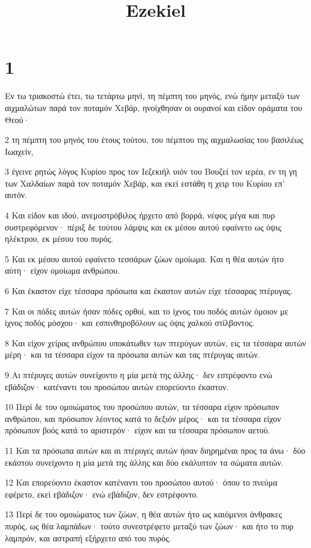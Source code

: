 

\title{Ezekiel}


\chapter{1}

\par Εν τω τριακοστώ έτει, τω τετάρτω μηνί, τη πέμπτη του μηνός, ενώ ήμην μεταξύ των αιχμαλώτων παρά τον ποταμόν Χεβάρ, ηνοίχθησαν οι ουρανοί και είδον οράματα του Θεού·
\par 2 τη πέμπτη του μηνός του έτους τούτου, του πέμπτου της αιχμαλωσίας του βασιλέως Ιωαχείν,
\par 3 έγεινε ρητώς λόγος Κυρίου προς τον Ιεζεκιήλ υιόν του Βουζεί τον ιερέα, εν τη γη των Χαλδαίων παρά τον ποταμόν Χεβάρ, και εκεί εστάθη η χειρ του Κυρίου επ' αυτόν.
\par 4 Και είδον και ιδού, ανεμοστρόβιλος ήρχετο από βορρά, νέφος μέγα και πυρ συστρεφόμενον· πέριξ δε τούτου λάμψις και εκ μέσου αυτού εφαίνετο ως όψις ηλέκτρου, εκ μέσου του πυρός.
\par 5 Και εκ μέσου αυτού εφαίνετο τεσσάρων ζώων ομοίωμα. Και η θέα αυτών ήτο αύτη· είχον ομοίωμα ανθρώπου.
\par 6 Και έκαστον είχε τέσσαρα πρόσωπα και έκαστον αυτών είχε τέσσαρας πτέρυγας.
\par 7 Και οι πόδες αυτών ήσαν πόδες ορθοί, και το ίχνος του ποδός αυτών όμοιον με ίχνος ποδός μόσχου· και εσπινθηροβόλουν ως όψις χαλκού στίλβοντος.
\par 8 Και είχον χείρας ανθρώπου υποκάτωθεν των πτερύγων αυτών, εις τα τέσσαρα αυτών μέρη· και τα τέσσαρα είχον τα πρόσωπα αυτών και τας πτέρυγας αυτών.
\par 9 Αι πτέρυγες αυτών συνείχοντο η μία μετά της άλλης· δεν εστρέφοντο ενώ εβάδιζον· κατέναντι του προσώπου αυτών επορεύοντο έκαστον.
\par 10 Περί δε του ομοιώματος του προσώπου αυτών, τα τέσσαρα είχον πρόσωπον ανθρώπου, και πρόσωπον λέοντος κατά το δεξιόν μέρος· και τα τέσσαρα είχον πρόσωπον βοός κατά το αριστερόν· είχον και τα τέσσαρα πρόσωπον αετού.
\par 11 Και τα πρόσωπα αυτών και αι πτέρυγες αυτών ήσαν διηρημέναι προς τα άνω· δύο εκάστου συνείχοντο η μία μετά της άλλης και δύο εκάλυπτον τα σώματα αυτών.
\par 12 Και επορεύοντο έκαστον κατέναντι του προσώπου αυτού· όπου το πνεύμα εφέρετο, εκεί εβάδιζον· ενώ εβάδιζον, δεν εστρέφοντο.
\par 13 Περί δε του ομοιώματος των ζώων, η θέα αυτών ήτο ως καιόμενοι άνθρακες πυρός, ως θέα λαμπάδων· τούτο συνεστρέφετο μεταξύ των ζώων· και ήτο το πυρ λαμπρόν, και αστραπή εξήρχετο από του πυρός.

